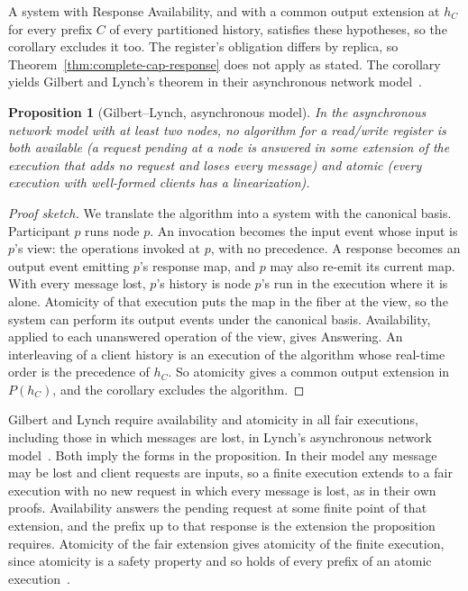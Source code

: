\documentclass[sigconf]{cidr-2027}
\newtheorem{proposition}{Proposition}
\theoremstyle{remark}
\newcommand{\outnoun}{output extension\xspace}%
\newcommand{\fiber}[1]{P(#1)}
\begin{document}
A system with Response Availability, and with a common \outnoun at $h_C$ for
every prefix $C$ of every partitioned history, satisfies these hypotheses, so
the corollary excludes it too. The register's obligation differs by replica, so
Theorem~\ref{thm:complete-cap-response} does not apply as stated. The
corollary yields Gilbert and Lynch's theorem in their asynchronous network
model~\cite{gilbert2002cap}.

\begin{proposition}[Gilbert--Lynch, asynchronous model]
\label{prop:gl-async}
In the asynchronous network model with at least two nodes, no algorithm for a
read/write register is both available (a request pending at a node is
answered in some extension of the execution that adds no request and loses
every message) and atomic (every execution with well-formed clients has a
linearization).
\end{proposition}

\begin{proof}[Proof sketch]
We translate the algorithm into a system with the canonical basis. Participant
$p$ runs node $p$. An invocation becomes the input event whose input is $p$'s
view: the operations invoked at $p$, with no precedence. A response becomes an
output event emitting $p$'s response map, and $p$ may also re-emit its current
map. With every message lost, $p$'s history is node $p$'s run in the
execution where it is alone. Atomicity of that execution puts the map in the
fiber at the view, so the system can perform its output events under the
canonical basis. Availability, applied to each unanswered operation of the
view, gives Answering. An interleaving of a client history is an execution of
the algorithm whose real-time order is the precedence of $h_C$. So atomicity
gives a common \outnoun in $\fiber{h_C}$, and the corollary excludes the
algorithm.
\end{proof}

Gilbert and Lynch require availability and atomicity in all fair executions,
including those in which messages are lost, in Lynch's asynchronous network
model~\cite[Theorem~1]{gilbert2002cap}\cite[Chapter~8]{lynch1996distributed}. Both imply the forms in the proposition. In their model any message may be
lost and client requests are inputs, so a finite execution extends to a fair
execution with no new request in which every message is lost, as in their
own proofs. Availability answers the pending request at some finite point of
that extension, and the prefix up to that response is the extension the
proposition requires. Atomicity of the fair extension gives atomicity of the
finite execution, since atomicity is a safety property and so holds of every
prefix of an atomic execution~\cite[Chapter~13]{lynch1996distributed}.
\end{document}
